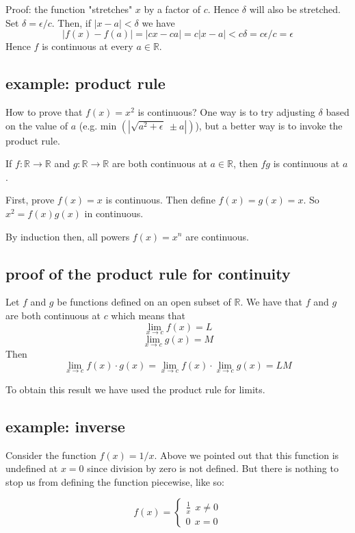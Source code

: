 \documentclass[11pt, oneside]{article}
\begin{document}
Proof:  the function "stretches" $x$ by a factor of $c$.  Hence $\delta$ will also be stretched.  Set $\delta = \epsilon/c$.  Then, if $|x-a| < \delta$ we have
\[ |f(x) - f(a)| = |cx - ca| = c |x-a| < c \delta = c \epsilon / c = \epsilon \]
Hence $f$ is continuous at every $a \in \mathbb{R}$.

\subsection*{example:  product rule}
How to prove that $f(x) = x^2$ is continuous?  One way is to try adjusting $\delta$ based on the value of $a$ (e.g. min $(| \sqrt{a^2 + \epsilon} \ \pm a|)$), but a better way is to invoke the product rule.

If $f: \mathbb{R} \rightarrow \mathbb{R}$ and $g: \mathbb{R} \rightarrow \mathbb{R}$ are both continuous at $a \in  \mathbb{R}$, then $fg$ is continuous at $a$.

First, prove $f(x) = x$ is continuous.  Then define $f(x) = g(x) = x$.  So $x^2 = f(x) g(x)$ in continuous.

By induction then, all powers $f(x) = x^n$ are continuous.

\subsection*{proof of the product rule for continuity}
Let $f$ and $g$ be functions defined on an open subset of $\mathbb{R}$.  We have that $f$ and $g$ are both continuous at $c$ which means that
\[ \lim_{x \rightarrow c} f(x) = L \]
\[ \lim_{x \rightarrow c} g(x) = M \]
Then
\[ \lim_{x \rightarrow c} f(x) \cdot g(x) = \lim_{x \rightarrow c} f(x) \cdot \lim_{x \rightarrow c} g(x) = LM \]

To obtain this result we have used the product rule for limits. 

\subsection*{example:  inverse}
Consider the function $f(x) = 1/x$.  Above we pointed out that this function is undefined at $x=0$ since division by zero is not defined.  But there is nothing to stop us from defining the function piecewise, like so:

\[ f(x) = 
\begin{cases}
\frac{1}{x} \ \ x \ne 0 \\
0 \ \ x = 0 
\end{cases} \]
\end{document}
